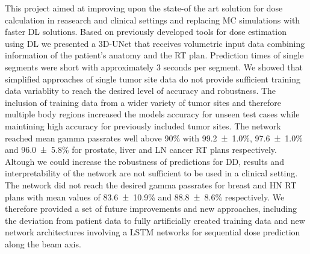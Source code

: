 
This project aimed at improving upon the state-of the art solution for dose calculation in reasearch and clinical settings and replacing \acs{MC} simulations with faster \acs{DL} solutions.
Based on previously developed tools for dose estimation using \acs{DL} we presented a 3D-UNet that receives volumetric input data combining information of the patient's anatomy and the \acs{RT} plan.
Prediction times of single segments were short with approximately 3 seconds per segment.
We showed that simplified approaches of single tumor site data do not provide sufficient training data variablity to reach the desired level of accuracy and robustness.
The inclusion of training data from a wider variety of tumor sites and therefore multiple body regions increased the models accuracy for unseen test cases while maintining high accuracy for previously included tumor sites.
The network reached mean gamma passrates well above 90\% with 99.2~±~1.0\%, 97.6~±~1.0\% and 96.0~±~5.8\% for prostate, liver and \acs{LN} cancer \acs{RT} plans respectively.\\
Altough we could increase the robustness of predictions for \acs{DD}, results and interpretability of the network are not sufficient to be used in a clinical setting.
The network did not reach the desired gamma passrates for breast and \acs{HN} \acs{RT} plans with mean values of 83.6~±~10.9\% and 88.8~±~8.6\% respectively. 
We therefore provided a set of future improvements and new approaches, including the deviation from patient data to fully artificially created training data and new network architectures involving a \acs{LSTM} networks for sequential dose prediction along the beam axis.\\
